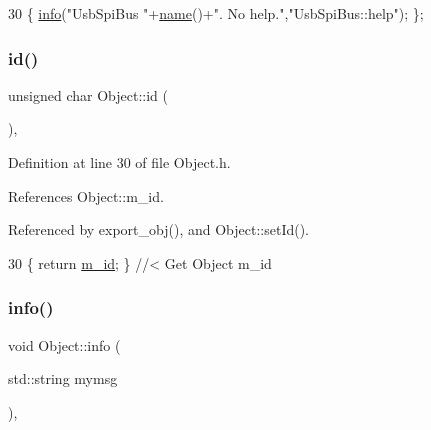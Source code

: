 \begin{DoxyCode}
30 \{ \hyperlink{classObject_a644fd329ea4cb85f54fa6846484b84a8}{info}(\textcolor{stringliteral}{"UsbSpiBus "}+\hyperlink{classObject_a300f4c05dd468c7bb8b3c968868443c1}{name}()+\textcolor{stringliteral}{". No help."},\textcolor{stringliteral}{"UsbSpiBus::help"}); \};
\end{DoxyCode}
\mbox{\label{classObject_af99145335cc61ff6e2798ea17db009d2}} 
\subsubsection{\texorpdfstring{id()}{id()}}
{\footnotesize\ttfamily unsigned char Object\+::id (\begin{DoxyParamCaption}{ }\end{DoxyParamCaption})\hspace{0.3cm}{\ttfamily [inline]}, {\ttfamily [inherited]}}



Definition at line 30 of file Object.\+h.



References Object\+::m\+\_\+id.



Referenced by export\+\_\+obj(), and Object\+::set\+Id().


\begin{DoxyCode}
30 \{ \textcolor{keywordflow}{return} \hyperlink{classObject_aca74b9dbfed7b5556ea2d56c65b6b6b0}{m\_id};         \} \textcolor{comment}{//< Get Object m\_id }
\end{DoxyCode}
\mbox{\label{classObject_a644fd329ea4cb85f54fa6846484b84a8}} 
\subsubsection{\texorpdfstring{info()}{info()}\hspace{0.1cm}{\footnotesize\ttfamily [1/2]}}
{\footnotesize\ttfamily void Object\+::info (\begin{DoxyParamCaption}\item[{std\+::string}]{mymsg }\end{DoxyParamCaption})\hspace{0.3cm}{\ttfamily [inline]}, {\ttfamily [inherited]}}



